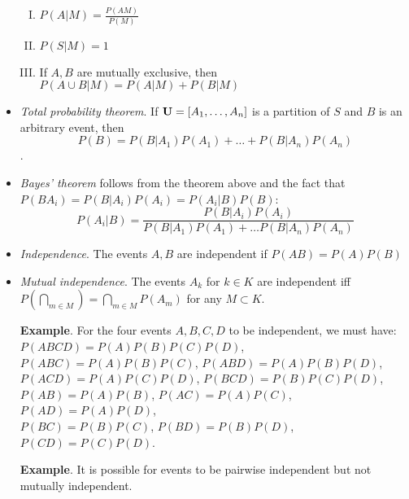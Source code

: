 \documentclass[a4paper, oneside]{book}
\begin{document}
\begin{itemize}
	\begin{enumerate}[I.]
	\item $P(A|M) = \frac{P(AM)}{P(M)}$
	\item $P(S|M)=1$
	\item If $A,B$ are mutually exclusive, then $P(A\cup B | M) = P(A|M)+P(B|M)$
	\end{enumerate}
\item \textit{Total probability theorem}. If $\mathbf U = [ A_1, \hdots, A_n]$ is a partition of $S$ and $B$ is an arbitrary event, then $$P(B)=P(B|A_1)P(A_1)+\hdots+P(B|A_n)P(A_n)$$.
\item \textit{Bayes' theorem} follows from the theorem above and the fact that $P(BA_i)=P(B|A_i)P(A_i)=P(A_i|B)P(B)$: $$P(A_i|B) = \frac{P(B|A_i)P(A_i)}{P(B|A_1)P(A_1) + \hdots P(B|A_n)P(A_n)}$$
\item \textit{Independence}. The events $A,B$ are independent if $P(AB) = P(A)P(B)$
\item \textit{Mutual independence}. The events $A_k$ for $k\in K$ are independent iff $P(\bigcap_{m\in M})=\bigcap_{m\in M}P(A_m)$ for any $M\subset K$.

\textbf{Example}. For the four events $A,B,C,D$ to be independent, we must have:\\%
$P(ABCD)=P(A)P(B)P(C)P(D)$,  \\
$P(ABC)=P(A)P(B)P(C)$,  $P(ABD)=P(A)P(B)P(D)$, \\
$P(ACD)=P(A)P(C)P(D)$,  $P(BCD)=P(B)P(C)P(D)$, \\
$P(AB)=P(A)P(B)$, $P(AC)=P(A)P(C)$, $P(AD)=P(A)P(D)$, \\
$P(BC)=P(B)P(C)$, $P(BD)=P(B)P(D)$, $P(CD)=P(C)P(D)$.

\textbf{Example}. It is possible for events to be pairwise independent but not mutually independent.

\end{itemize}





\end{document}

